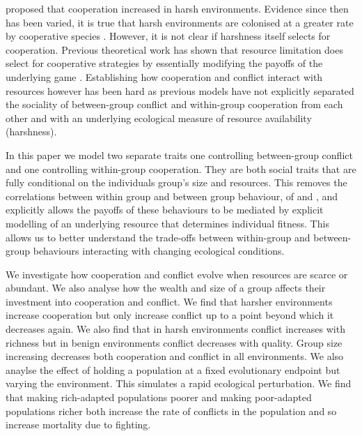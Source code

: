  proposed that cooperation increased in harsh environments. Evidence since then has been varied, it is true that harsh environments are colonised at a greater rate by cooperative species \citep{cornwallisCooperationFacilitates2017}. However, it is not clear if harshness itself selects for cooperation. Previous theoretical work has shown that resource limitation does select for cooperative strategies by essentially modifying the payoffs of the underlying game \citep{requejoEvolutionCooperation2011,smaldinoIncreasedCosts2013}. Establishing how cooperation and conflict interact with resources however has been hard as previous models have not explicitly separated the sociality of between-group conflict and within-group cooperation from each other and with an underlying ecological measure of resource availability (harshness). 

In this paper we model two separate traits one controlling between-group conflict and one controlling within-group cooperation. They are both social traits that are fully conditional on the individuals group's size and resources. This removes the correlations between within group and between group behaviour, of \citet{choiCoevolutionParochial2007} and \citet{lehmannWarEvolution2008}, and explicitly allows the payoffs of these behaviours to be mediated by explicit modelling of an underlying resource that determines individual fitness. This allows us to better understand the trade-offs between within-group and between-group behaviours interacting with changing ecological conditions.

We investigate how cooperation and conflict evolve when resources are scarce or abundant. We also analyse how the wealth and size of a group affects their investment into cooperation and conflict. We find that harsher environments increase cooperation but only increase conflict up to a point beyond which it decreases again. We also find that in harsh environments conflict increases with richness but in benign environments conflict decreases with quality. Group size increasing decreases both cooperation and conflict in all environments. We also anaylse the effect of holding a population at a fixed evolutionary endpoint but varying the environment. This simulates a rapid ecological perturbation. We find that making rich-adapted populations poorer and making poor-adapted populations richer both increase the rate of conflicts in the population and so increase mortality due to fighting. 
